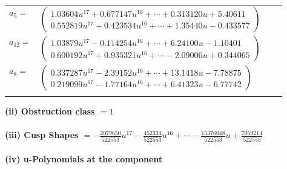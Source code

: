 \documentclass[1p]{elsarticle_modified}
\theoremstyle{definition}
\begin{document}
\begin{tabular}{m{7pt} m{180pt} m{7pt} m{180pt} }
\flushright $a_{5}=$&$\begin{pmatrix}1.03604 u^{17}+0.677147 u^{16}+\cdots+0.313120 u+5.40611\\0.552819 u^{17}+0.423534 u^{16}+\cdots+1.35440 u-0.433577\end{pmatrix}$ \\
\flushright $a_{12}=$&$\begin{pmatrix}1.03879 u^{17}-0.114254 u^{16}+\cdots+6.24100 u-1.10401\\0.600192 u^{17}+0.935321 u^{16}+\cdots-2.09006 u+0.344065\end{pmatrix}$ \\
\flushright $a_{8}=$&$\begin{pmatrix}0.337287 u^{17}-2.39152 u^{16}+\cdots+13.1418 u-7.78875\\0.219099 u^{17}-1.77164 u^{16}+\cdots+6.41323 u-6.77742\end{pmatrix}$\\&\end{tabular}
\flushleft \textbf{(ii) Obstruction class $= 1$}\\~\\
\flushleft \textbf{(iii) Cusp Shapes $= -\frac{2079650}{522553} u^{17}-\frac{452334}{522553} u^{16}+\cdots-\frac{15376048}{522553} u+\frac{7059214}{522553}$}\\~\\
\newpage\renewcommand{\arraystretch}{1}
\flushleft \textbf{(iv) u-Polynomials at the component}\newline \\
\end{document}
